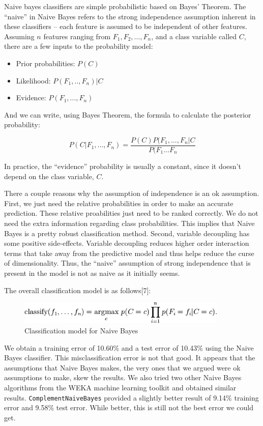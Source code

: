 \documentclass[a4paper,10pt]{article}
\begin{document}
Naive bayes classifiers are simple probabilistic based on Bayes' Theorem. The ``naive'' in Naive Bayes refers to the strong independence
assumption inherent in these classifiers -- each feature is assumed to be independent of other features. Assuming $n$ features ranging
from $F_1,F_2,...,F_n$, and a class variable called $C$, there are a few inputs to the probability model:
\begin{itemize}
 \item Prior probabilities: $P(C)$
   \item Likelihood: $P(F_1,..,F_n)|C$
   \item Evidence: $P(F_1,...,F_n)$
\end{itemize}

And we can write, using Bayes Theorem, the formula to calculate the posterior probability:

 $$ P(C|F_1,...,F_n) = \frac{P(C)P(F_1,...,F_n|C}{P(F_1...F_n} $$
 
In practice, the ``evidence'' probability is usually a constant, since it doesn't depend on the class variable, $C$.

There a couple reasons why the assumption of independence is an ok assumption. First, we just need the relative probabilities 
in order to make an accurate prediction. These relative proabilities just need to be ranked correctly. We do not need the extra
information regarding class probabilities. This implies that Naive Bayes is a pretty robust classification method. Second, variable 
decoupling has some positive side-effects. Variable decoupling reduces higher order interaction terms that take away from the
predictive model and thus helps reduce the curse of dimensionality. Thus, the ``naive'' assumption of strong independence that is
present in the model is not as naive as it initially seems.

The overall classification model is as follows[7]: 

\begin{figure}[h]
 \centering
 \includegraphics[width=100mm]{../resources/bayes-classify-formula.png}
 \caption{Classification model for Naive Bayes}
\end{figure}


We obtain a training error of 10.60\% and a test error of 10.43\% using the Naive Bayes classifier. This misclassification
error is not that good. It appears that the assumptions that Naive Bayes makes, the very ones that we argued were ok
assumptions to make, skew the results. We also tried two other Naive Bayes algorithms from the WEKA machine learning
toolkit and obtained similar results. \texttt{ComplementNaiveBayes} provided a slightly better result of 9.14\% training
error and 9.58\% test error. While better, this is still not the best error we could get.
\end{document}
